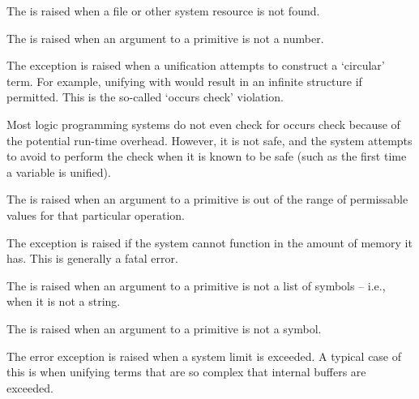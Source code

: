 \begin{description}
The  is raised when a file or other system resource is not found.
  
\item[\constant{'eNUMNEEDD'}]
\label{eNUMNEEDD}
  
The  is raised when an argument to a primitive is not a number. 

\item[\constant{'eOCCUR'}]
\label{eOCCUR}

The  exception is raised when a unification attempts to construct a `circular' term. For example, unifying  with  would result in an infinite structure if permitted. This is the so-called `occurs check' violation.

Most logic programming systems do not even check for occurs check because of the potential run-time overhead. However, it is not safe, and the \go system attempts to avoid to perform the check when it is known to be safe (such as the first time a variable is unified).

\item[\constant{'eRANGE'}]
\label{eRANGE}
  
The  is raised when an argument to a primitive is out of the range of permissable values for that particular operation.

\item[\constant{'eSPACE'}]
\label{eSPACE}

The  exception is raised if the system cannot function in the amount of memory it has. This is generally a fatal error.
  
\item[\constant{'eSTRNEEDD'}]
\label{eSTRNEEDD}
  
The  is raised when an argument to a primitive is not a list of symbols -- i.e., when it is not a string.
  
\item[\constant{'eSYMNEEDD'}]
\label{eSYMNEEDD}
  
The  is raised when an argument to a primitive is not a symbol.


\item[\constant{'eSYSTEM'}]
\label{eSYSTEM}

The  error exception is raised when a system limit is exceeded. A typical case of this is when unifying terms that are so complex that internal buffers are exceeded.


\end{description}
